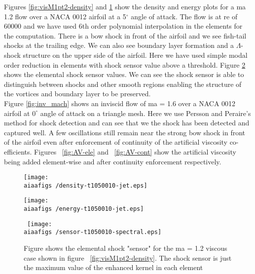  Figures \ref{fig:visM1pt2-density} and \ref{fig:visM1pt2-energy} show the density and energy plots for a \gls{ma} 1.2 flow over a NACA 0012 airfoil at a 5$^{\circ}$ angle of attack. The flow is at \gls{re} of 60000 and we have used 6th order polynomial interpolation in the elements for the computation. There is a bow shock in front of the airfoil and we see fish-tail shocks at the trailing edge. We can also see boundary layer formation and a $\Lambda$-shock structure on the upper side of the airfoil. Here we have used simple modal order reduction in elements with shock sensor value above a threshold. Figure \ref{fig:sensor} shows the elemental shock sensor values. We can see the shock sensor is able to distinguish between shocks and other smooth regions enabling the structure of the vortices and boundary layer to be preserved. \\
 
 Figure \ref{fig:inv_mach} shows an inviscid flow of \gls{ma} = 1.6 over a NACA 0012 airfoil at $0^{\circ}$ angle of attack on a triangle mesh. Here we use Persson and Peraire's method  for shock detection and can see that we the shock has been detected and captured well. A few oscillations still remain near the strong bow shock in front of the airfoil even after enforcement of continuity of the artificial viscosity co-efficients. Figures ~\ref{fig:AV-ele} and ~\ref{fig:AV-cont} show the artificial viscosity being added element-wise and after continuity enforcement respectively.

\begin{figure}
\centering
\begin{minipage}[t]{.5\textwidth}
  \centering
  \texttt{[image: \\aiaafigs /density-t1050010-jet.eps]}
  \label{fig:visM1pt2-density}
\end{minipage}%
\begin{minipage}[t]{.5\textwidth}
  \centering
  \texttt{[image: \\aiaafigs /energy-t1050010-jet.eps]}
  \label{fig:visM1pt2-energy}
\end{minipage}
\end{figure} 

\begin{figure}[h] \tt
\centering
\texttt{[image: \\aiaafigs /sensor-t1050010-spectral.eps]}
\caption{Figure shows the elemental shock "sensor" for the \gls{ma} = 1.2 viscous case shown in figure ~\ref{fig:visM1pt2-density}. The shock sensor is just the maximum value of the enhanced kernel in each element}
\label{fig:sensor}
\end{figure}

